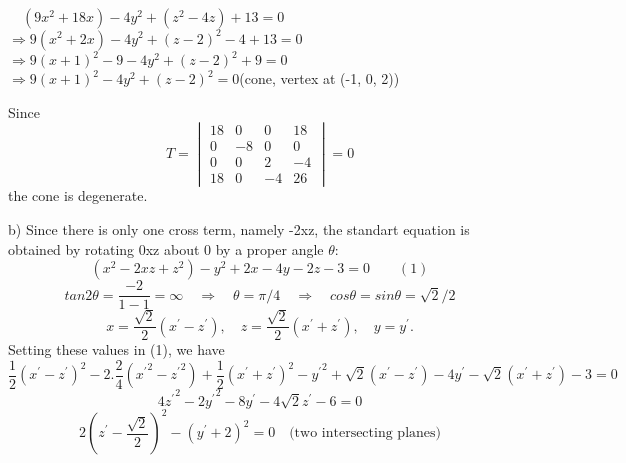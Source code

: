 \documentclass[11pt]{amsbook}
\begin{document}
$\quad(9x^2+18x)-4y^2+(z^2-4z)+13=0$\\
$\Rightarrow 9(x^2+2x)-4y^2+(z-2)^2-4+13=0$\\
$\Rightarrow 9(x+1)^2-9-4y^2+(z-2)^2+9=0$\\
$\Rightarrow 9(x+1)^2-4y^2+(z-2)^2=0$\quad (cone, vertex at (-1, 0, 2))

Since 
	\[
	T=
	\begin{vmatrix}
   	18 & 0 & 0 & 18\\
	0 & -8 & 0 & 0\\
	0 & 0 & 2 & -4\\
	18 & 0 & -4 & 26
	\end{vmatrix}
	=0
	\]
the cone is degenerate.
	\begin{hEnumerateAlpha}
	\item[b)]
	Since there is only one cross term, namely -2xz, the standart equation is obtained by rotating 0xz about 0 by a proper angle $\theta$:
	\[
	(x^2-2xz+z^2)-y^2+2x-4y-2z-3=0 \qquad (1)
	\]
	\[	
tan2\theta = \frac{-2}{1-1} = \infty \quad\Rightarrow\quad \theta = \pi / 4 \quad\Rightarrow\quad cos\theta = sin\theta = \sqrt{2}/2
	\]
	\[
	x=\frac{\sqrt{2}}{2} (x^{\prime}-z^{\prime}),\quad z=\frac{\sqrt{2}}{2} (x^{\prime}+z^{\prime}),\quad y=y^{\prime}.
	\]
	Setting these values in (1), we have
	\[
	\frac{1}{2}(x^{\prime}-z^{\prime})^2-2.\frac{2}{4}({x^{\prime}}^2-{z^{\prime}}^2) + \frac{1}{2} (x^{\prime}+z^{\prime})^2 - {y^{\prime}}^2+\sqrt{2}(x^{\prime}-z^{\prime})-4y^{\prime}-\sqrt{2}(x^{\prime}+z^{\prime})-3=0 
	\]
	\[
	4{z^{\prime}}^2-2{y^{\prime}}^2-8y^{\prime}-4\sqrt{2}z^{\prime}-6=0
	\]
	\[
	2(z^{\prime}-\frac{\sqrt{2}}{2})^2-(y^{\prime}+2)^2=0\quad \text{(two intersecting planes)} 
	\] 
	
	\end{hEnumerateAlpha}
\end{document}
